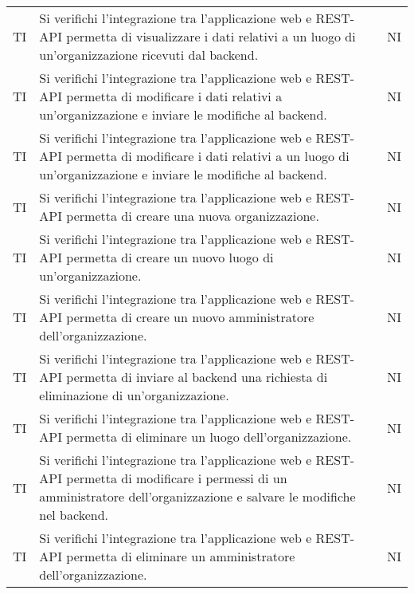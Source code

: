 {\begin{longtable}{ c C{8.5cm} C{1cm}}
TI & Si verifichi l’integrazione tra l’applicazione web e REST-API permetta di visualizzare i dati relativi a un luogo di un’organizzazione ricevuti dal backend.& NI \\
TI & Si verifichi l’integrazione tra l’applicazione web e REST-API permetta di modificare i dati relativi a un’organizzazione e inviare le modifiche al backend.& NI \\
TI & Si verifichi l’integrazione tra l’applicazione web e REST-API permetta di modificare i dati relativi a un luogo di un’organizzazione e inviare le modifiche al backend.& NI \\
TI & Si verifichi l’integrazione tra l’applicazione web e REST-API permetta di creare una nuova organizzazione.& NI \\
TI & Si verifichi l’integrazione tra l’applicazione web e REST-API permetta di creare un nuovo luogo di un’organizzazione.& NI \\
TI & Si verifichi l’integrazione tra l’applicazione web e REST-API permetta di creare un nuovo amministratore dell’organizzazione.& NI \\
TI & Si verifichi l’integrazione tra l’applicazione web e REST-API permetta di inviare al backend una richiesta di eliminazione di un’organizzazione.& NI \\
TI & Si verifichi l’integrazione tra l’applicazione web e REST-API permetta di eliminare un luogo dell’organizzazione.& NI \\
TI & Si verifichi l’integrazione tra l’applicazione web e REST-API permetta di modificare i permessi di un amministratore dell’organizzazione e salvare le modifiche nel backend.& NI \\
TI & Si verifichi l’integrazione tra l’applicazione web e REST-API permetta di eliminare un amministratore dell’organizzazione.& NI \\




\end{longtable}
}